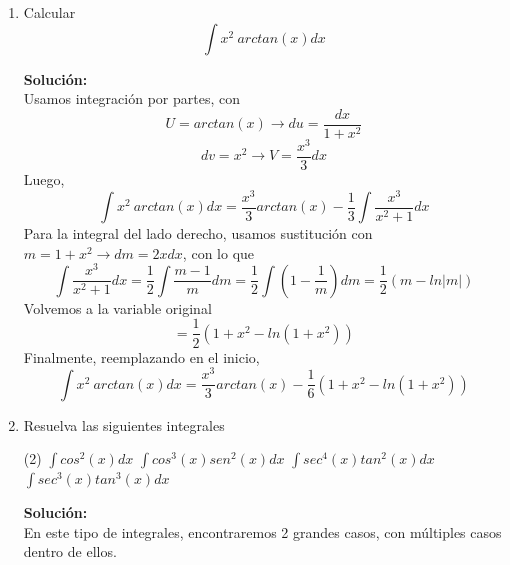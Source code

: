 \documentclass[12pt]{article}
\newenvironment{solucion}
{\begin{mdframed}[backgroundcolor=black!10]
		{\bf Solución:}\\
	}
	{
	\end{mdframed}
}
\newenvironment{preguntas}
{\begin{enumerate}\itemsep12pt
	}
	{
	\end{enumerate}
}
\newcommand{\ra}{\rightarrow}
\begin{document}
\begin{preguntas}
\begin{solucion}
\begin{enumerate}[a)]
$$			= x\ arctan(x) - \dfrac{1}{2}ln(w)$$
			$$= \ arctan(x) - \dfrac{1}{2}ln(1+x^2) + c$$
\item $\displaystyle\int ln(x)dx$\\\\
			En este caso,
			$$U = ln(x), \quad dv = dx \ra du = \dfrac{dx}{x}, \quad V = x$$
			Luego, 
			$$\displaystyle\int ln(x)dx
			= xln(x) - \displaystyle\int \dfrac{xdx}{x}
			= xln(x) - \displaystyle\int dx
			= xln(x) - x + c
			$$
\item $\displaystyle\int ln^2(x)dx$\\\\
			De la misma forma que antes
			$$U = ln^2(x), \quad dv = dx \ra du = 2ln(x)\dfrac{1}{x}dx, \quad V = x$$
			Con esto,
			$$\displaystyle\int ln^2(x)dx = xln^2(x) - 2\displaystyle\int ln(x)dx$$
			Por el ejercicio anterior sabemos que
			$$\displaystyle\int ln(x)dx = xln(x) -x$$
			Luego,
			$$=xln^2(x) - 2(xln(x) - x) + c$$
			Finalmente,
			$$\displaystyle\int ln^2(x)dx = xln^2(x) - 2xln(x) + x + c$$
\end{enumerate}
\end{solucion}
\item Calcular
	$$\displaystyle\int x^2\ arctan(x)dx$$
\begin{solucion}
Usamos integración por partes, con
		$$U = arctan(x) \ra du = \dfrac{dx}{1+x^2}$$
		$$dv = x^2 \ra V = \dfrac{x^3}{3}dx$$
		Luego,
		$$\displaystyle\int x^2\ arctan(x)dx = \dfrac{x^3}{3}arctan(x) - \dfrac{1}{3} \displaystyle\int \dfrac{x^3}{x^2+1}dx$$
		Para la integral del lado derecho, usamos sustitución con $m = 1+x^2 \ra dm = 2xdx$, con lo que
		$$\displaystyle\int \dfrac{x^3}{x^2+1}dx
		= \dfrac{1}{2}\displaystyle\int \dfrac{m-1}{m}dm
		= \dfrac{1}{2}\displaystyle\int \left(1-\dfrac{1}{m}\right)dm = \dfrac{1}{2}(m-ln|m|)$$
		Volvemos a la variable original
		$$= \dfrac{1}{2}(1+x^2-ln(1+x^2))$$
		Finalmente, reemplazando en el inicio,
		$$\displaystyle\int x^2\ arctan(x)dx = \dfrac{x^3}{3}arctan(x) - \dfrac{1}{6} (1+x^2-ln(1+x^2))$$
\end{solucion}
\item Resuelva las siguientes integrales
\begin{tasks}(2)
\task $\displaystyle\int cos^2(x)dx$
\task $\displaystyle\int cos^3(x)sen^2(x)dx$
\task $\displaystyle\int sec^4(x)tan^2(x)dx$
\task $\displaystyle\int sec^3(x)tan^3(x)dx$
\end{tasks}
\begin{solucion}
En este tipo de integrales, encontraremos 2 grandes casos, con múltiples casos dentro de ellos.\\


\end{solucion}
\end{preguntas}
\end{document}
